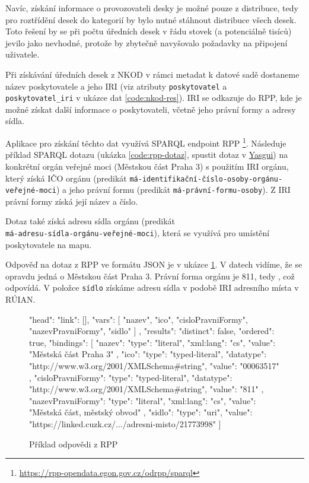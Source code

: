 Navíc, získání informace o provozovateli desky je možné pouze z distribuce, tedy pro roztřídění desek do kategorií by bylo nutné stáhnout distribuce všech desek. Toto řešení by se při počtu úředních desek v řádu stovek (a potenciálně tisíců) jevilo jako nevhodné, protože by zbytečně navyšovalo požadavky na připojení uživatele.

Při získávání úředních desek z NKOD v rámci metadat k datové sadě dostaneme název poskytovatele a jeho IRI (viz atributy \texttt{poskytovatel} a \\ \texttt{poskytovatel\_iri} v ukázce dat \ref{code:nkod-res}). IRI se odkazuje do RPP, kde je možné získat další informace o poskytovateli, včetně jeho právní formy a adresy sídla.

Aplikace pro získání těchto dat využívá SPARQL endpoint RPP \footnote{\url{https://rpp-opendata.egon.gov.cz/odrpp/sparql}}. Následuje příklad SPARQL dotazu (ukázka \ref{code:rpp-dotaz}, spustit dotaz v \href{https://api.triplydb.com/s/nPcS7GirV}{Yasgui}) na konkrétní orgán veřejné moci (Městskou část Praha 3) s použitím IRI orgánu, který získá IČO  orgánu (predikát \texttt{má-identifikační-číslo-osoby-orgánu-veřejné-moci}) a jeho právní formu (predikát \texttt{má-právní-formu-osoby}). Z IRI právní formy získá její název a číslo. 

Dotaz také získá adresu sídla orgánu (predikát \\ \texttt{má-adresu-sídla-orgánu-veřejné-moci}), která se využívá pro umístění poskytovatele na mapu.


Odpověď na dotaz z RPP ve formátu JSON je v ukázce \ref{code:rpp-res}. V datech vidíme, že se opravdu jedná o Městskou část Praha 3. Právní forma orgánu je 811, tedy , což odpovídá.
V položce \texttt{sídlo} získáme adresu sídla v podobě IRI adresního místa v RÚIAN.

\begin{figure}
\begin{code}
{
  "head": {
    "link": [],
    "vars": [
      "nazev",
      "ico",
      "cisloPravniFormy",
      "nazevPravniFormy",
      "sidlo"
    ]
  },
  "results": {
    "distinct": false,
    "ordered": true,
    "bindings": [
      {
        "nazev": {
          "type": "literal",
          "xml:lang": "cs",
          "value": "Městská část Praha 3"
        },
        "ico": {
          "type": "typed-literal",
          "datatype": "http://www.w3.org/2001/XMLSchema#string",
          "value": "00063517"
        },
        "cisloPravniFormy": {
          "type": "typed-literal",
          "datatype": "http://www.w3.org/2001/XMLSchema#string",
          "value": "811"
        },
        "nazevPravniFormy": {
          "type": "literal",
          "xml:lang": "cs",
          "value": "Městská část, městský obvod"
        },
        "sidlo": {
          "type": "uri",
          "value": "https://linked.cuzk.cz/.../adresni-misto/21773998"
        }
      }
    ]
  }
}
\end{code}
\caption{Příklad odpovědi z RPP}
\label{code:rpp-res}
\end{figure}

